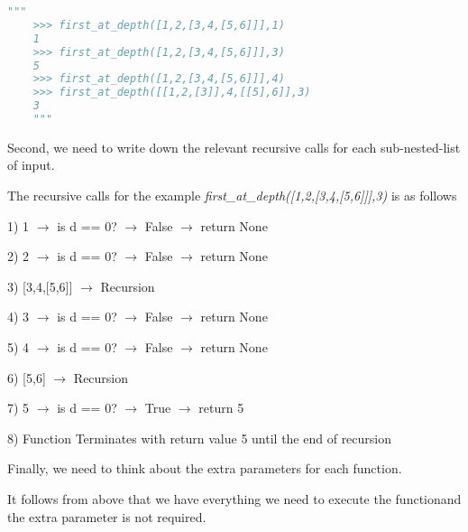 \documentclass[12pt]{article}
\begin{document}
\begin{enumerate}[a.]
\begin{mdframed}
    \begin{lstlisting}[language=python]
    """
    >>> first_at_depth([1,2,[3,4,[5,6]]],1)
    1
    >>> first_at_depth([1,2,[3,4,[5,6]]],3)
    5
    >>> first_at_depth([1,2,[3,4,[5,6]]],4)
    >>> first_at_depth([[1,2,[3]],4,[[5],6]],3)
    3
    """
    \end{lstlisting}

    \bigskip

    Second, we need to write down the relevant recursive calls for each sub-nested-list of input.

    \bigskip

    The recursive calls for the example \textit{first\_at\_depth([1,2,[3,4,[5,6]]],3)}
    is as follows

    \begin{mdframed}

        1) 1 $\to$ \color{red}is d == 0\color{black}? $\to$ False $\to$ return None

        2) 2 $\to$ \color{red}is d == 0\color{black}? $\to$ False $\to$ return None

        3) [3,4,[5,6]] $\to$ Recursion

        \bigskip

        \hspace{10mm} 4) 3 $\to$ \color{red}is d == 0\color{black}? $\to$ False $\to$ return None

        \hspace{10mm} 5) 4 $\to$ \color{red}is d == 0\color{black}? $\to$ False $\to$ return None

        \hspace{10mm} 6) [5,6] $\to$ Recursion

        \bigskip

        \hspace{10mm} \hspace{10mm} 7) 5 $\to$ \color{red}is d == 0\color{black}? $\to$ True $\to$ return 5

        \bigskip

        8) Function Terminates with return value 5 until the end of recursion

    \end{mdframed}

    \bigskip

    Finally, we need to think about the extra parameters for each function.

    \bigskip

    It follows from above that \color{red}we have everything we need to
    execute the function\color{black}\:and the extra parameter \color{red}is not
    required\color{black}.


\end{mdframed}
\end{enumerate}
\end{document}
